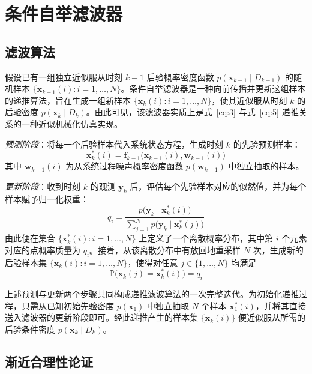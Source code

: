 \section{条件自举滤波器}\label{sec:bootstrap}

\subsection{滤波算法}\label{sec:alg}

假设已有一组独立近似服从时刻 $k - 1$ 后验概率密度函数 $p(\bm{x}_{k-1} \mid D_{k-1})$ 的随机样本 $\{\bm{x}_{k-1}(i) : i = 1, \dots, N\}$。条件自举滤波器是一种向前传播并更新这组样本的递推算法，旨在生成一组新样本 $\{\bm{x}_k(i) : i = 1, \dots, N\}$，使其近似服从时刻 $k$ 的后验密度 $p(\bm{x}_k \mid D_k)$。由此可见，该滤波器实质上是式~\eqref{eq:3} 与式~\eqref{eq:5} 递推关系的一种近似机械化仿真实现。

\emph{预测阶段}：将每一个后验样本代入系统状态方程，生成时刻 $k$ 的先验预测样本：
\begin{equation*}
\bm{x}_k^*(i) = \bm{f}_{k-1}\bigl(\bm{x}_{k-1}(i), \bm{w}_{k-1}(i)\bigr)
\end{equation*}
其中 $\bm{w}_{k-1}(i)$ 为从系统过程噪声概率密度函数 $p(\bm{w}_{k-1})$ 中独立抽取的样本。

\emph{更新阶段}：收到时刻 $k$ 的观测 $\bm{y}_k$ 后，评估每个先验样本对应的似然值，并为每个样本赋予归一化权重：
\begin{equation}\label{eq:8}
q_i = \frac{p\bigl(\bm{y}_k \mid \bm{x}_k^*(i)\bigr)}{\sum_{j=1}^N p\bigl(\bm{y}_k \mid \bm{x}_k^*(j)\bigr)}
\end{equation}
由此便在集合 $\{\bm{x}_k^*(i) : i = 1, \dots, N\}$ 上定义了一个离散概率分布，其中第 $i$ 个元素对应的点概率质量为 $q_i$。接着，从该离散分布中有放回地重采样 $N$ 次，生成新的后验样本集 $\{\bm{x}_k(i) : i = 1, \dots, N\}$，使得对任意 $j \in \{1, \dots, N\}$ 均满足
\begin{equation*}
\mathbb{P}\bigl(\bm{x}_k(j) = \bm{x}_k^*(i)\bigr) = q_i
\end{equation*}

上述预测与更新两个步骤共同构成递推滤波算法的一次完整迭代。为初始化递推过程，只需从已知初始先验密度 $p(\bm{x}_1)$ 中独立抽取 $N$ 个样本 $\bm{x}_1^*(i)$，并将其直接送入滤波器的更新阶段即可。经此递推产生的样本集 $\{\bm{x}_k(i)\}$ 便近似服从所需的后验条件密度 $p(\bm{x}_k \mid D_k)$。

\subsection{渐近合理性论证}\label{sec:just}

